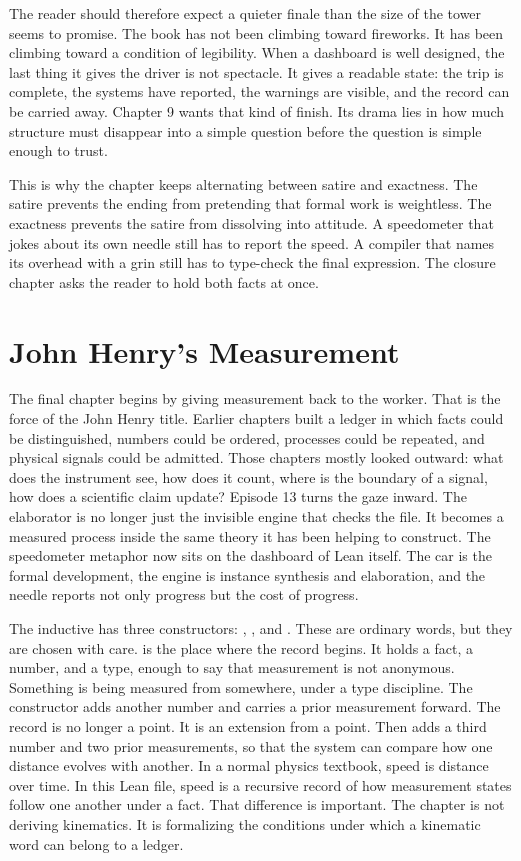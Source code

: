 The reader should therefore expect a quieter finale than the size of the tower
seems to promise. The book has not been climbing toward fireworks. It has been
climbing toward a condition of legibility. When a dashboard is well designed,
the last thing it gives the driver is not spectacle. It gives a readable
state: the trip is complete, the systems have reported, the warnings are
visible, and the record can be carried away. Chapter 9 wants that kind of
finish. Its drama lies in how much structure must disappear into a simple
question before the question is simple enough to trust.

This is why the chapter keeps alternating between satire and exactness. The
satire prevents the ending from pretending that formal work is weightless. The
exactness prevents the satire from dissolving into attitude. A speedometer
that jokes about its own needle still has to report the speed. A compiler that
names its overhead with a grin still has to type-check the final expression.
The closure chapter asks the reader to hold both facts at once.

\section{John Henry's Measurement}
\label{se:john-henry-measurement}

The final chapter begins by giving measurement back to the worker. That is the
force of the John Henry title. Earlier chapters built a ledger in which facts
could be distinguished, numbers could be ordered, processes could be repeated,
and physical signals could be admitted. Those chapters mostly looked outward:
what does the instrument see, how does it count, where is the boundary of a
signal, how does a scientific claim update? Episode 13 turns the gaze inward.
The elaborator is no longer just the invisible engine that checks the file. It
becomes a measured process inside the same theory it has been helping to
construct. The speedometer metaphor now sits on the dashboard of Lean itself.
The car is the formal development, the engine is instance synthesis and
elaboration, and the needle reports not only progress but the cost of progress.

The inductive  has three constructors: ,
, and . These are ordinary words, but they are
chosen with care.  is the place where the record begins. It holds
a fact, a number, and a type, enough to say that measurement is not anonymous.
Something is being measured from somewhere, under a type discipline. The
 constructor adds another number and carries a prior
measurement forward. The record is no longer a point. It is an extension from a
point. Then  adds a third number and two prior measurements, so
that the system can compare how one distance evolves with another. In a normal
physics textbook, speed is distance over time. In this Lean file, speed is a
recursive record of how measurement states follow one another under a fact.
That difference is important. The chapter is not deriving kinematics. It is
formalizing the conditions under which a kinematic word can belong to a
ledger.

